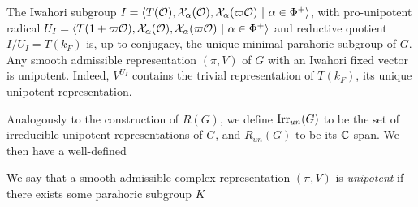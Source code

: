 \begin{example}
    The Iwahori subgroup $I=\langle T(\cO),\cX_\alpha(\cO),\cX_\alpha(\varpi\cO)\ |\ \alpha\in\Phi^+\rangle$, with pro-unipotent radical $U_I=\langle T(1+\varpi\cO),\cX_\alpha(\cO),\cX_\alpha(\varpi\cO)\ |\ \alpha\in\Phi^+\rangle$ and reductive quotient $I/U_I=T(k_F)$ is, up to conjugacy, the unique minimal parahoric subgroup of $G$. Any smooth admissible representation $(\pi,V)$ of $G$ with an Iwahori fixed vector is unipotent. Indeed, $V^{U_I}$ contains the trivial representation of $T(k_F)$, its unique unipotent representation. 
\end{example}

Analogously to the construction of $R(G)$, we define $\mathrm{Irr}_{un}(G)$ to be the set of irreducible unipotent representations of $G$, and $R_{un}(G)$ to be its $\mathbb{C}$-span. We then have a well-defined 



\vspace{2cm}




We say that a smooth admissible complex representation $(\pi,V)$ is \textit{unipotent} if there exists some parahoric subgroup $K$ 